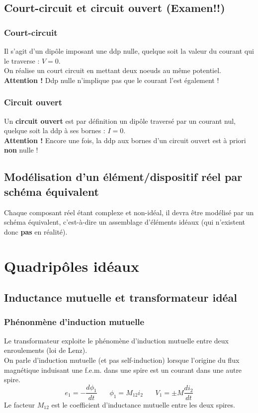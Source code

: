 \documentclass[british,french,11pt, a4paper, openany]{book}
\begin{document}
		
		
		
		
		
		
		\setcounter{section}{6}
		\section{Court-circuit et circuit ouvert (Examen!!)}
		\subsection{Court-circuit}
		Il s'agit d'un dipôle imposant une ddp nulle, quelque soit la valeur du courant qui le traverse : $V = 0$.\\ On réalise un court circuit en mettant deux noeuds au même potentiel.
		\textbf{Attention !} Ddp nulle n'implique pas que le courant l'est également !
		
		\subsection{Circuit ouvert}
		Un \textbf{circuit ouvert} est par définition un dipôle traversé par un courant nul, quelque soit la ddp à ses bornes : $I =0$.\\
		\textbf{Attention !} Encore une fois, la ddp aux bornes d'un circuit ouvert est à priori \textbf{non} nulle !
		
		\setcounter{section}{8}
		\section{Modélisation d'un élément/dispositif réel par schéma équivalent}
		Chaque composant réel étant complexe et non-idéal, il devra être modélisé par un schéma équivalent, c'est-à-dire un assemblage d'éléments idéaux (qui n'existent donc \textbf{pas} en réalité).
		
		
		\chapter{Quadripôles idéaux}
		\setcounter{section}{2}
		\section{Inductance mutuelle et transformateur idéal}
		\subsection{Phénonmène d'induction mutuelle}
		Le transformateur exploite le phénomène d'induction mutuelle entre deux enroulements (loi de Lenz).\\
		On parle d'induction mutuelle (et pas self-induction) lorsque l'origine du flux magnétique induisant une f.e.m. dans une spire est un courant dans une autre spire.
		\begin{equation}
		e_1 = -\frac{d\phi_1}{dt}\ \ \ \ \ \ \ \ \phi_1 = M_{12}i_2\ \ \ \ \ \ \ \ V_1 = \pm M\frac{di_2}{dt}
		\end{equation}
		Le facteur $M_{12}$ est le coefficient d'inductance mutuelle entre les deux spires.
		
\end{document}
